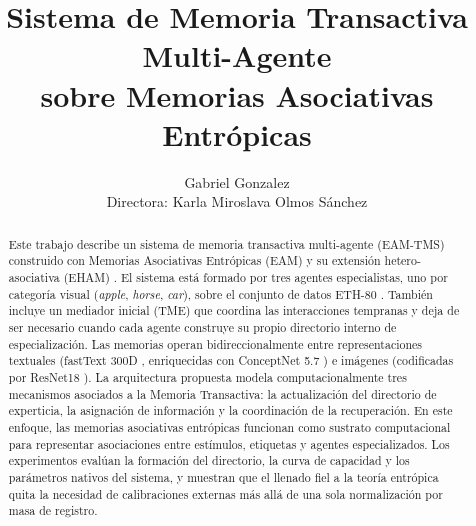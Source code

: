 \documentclass[11pt]{article}
\title{%
    \textbf{Sistema de Memoria Transactiva Multi-Agente}\\
    \textbf{sobre Memorias Asociativas Entrópicas}\\[0.5em]
}
\author{Gabriel Gonzalez\\[0.4em]\small Directora: Karla Miroslava Olmos Sánchez}
\begin{document}
\maketitle

\begin{abstract}
Este trabajo describe un sistema de memoria transactiva multi-agente (EAM-TMS) construido
con Memorias Asociativas Entrópicas (EAM) y su extensión hetero-asociativa
(EHAM) \cite{pineda2021entropic,morales2024hetero}.
El sistema está formado por tres agentes especialistas, uno por categoría visual
(\textit{apple}, \textit{horse}, \textit{car}), sobre el conjunto de datos ETH-80
\cite{leibe2003eth80}. También incluye un mediador inicial (TME) que coordina las
interacciones tempranas y deja de ser necesario cuando cada agente construye su propio
directorio interno de especialización.
Las memorias operan bidireccionalmente entre representaciones textuales (fastText 300D
\cite{bojanowski2017fasttext}, enriquecidas con ConceptNet 5.7 \cite{speer2017conceptnet})
e imágenes (codificadas por ResNet18 \cite{he2016resnet}).
La arquitectura propuesta modela computacionalmente tres mecanismos asociados a la Memoria Transactiva\cite{wegner1987transactive}: 
la actualización del directorio de experticia, 
la asignación de información y la coordinación de la recuperación. 
En este enfoque, las memorias asociativas entrópicas funcionan como sustrato computacional para representar asociaciones entre estímulos, 
etiquetas y agentes especializados.
Los experimentos evalúan la formación del directorio, la curva de capacidad y los
parámetros nativos del sistema, y muestran que el llenado fiel a la teoría entrópica
quita la necesidad de calibraciones externas más allá de una sola normalización por
masa de registro.
\end{abstract}

\tableofcontents
\newpage











\end{document}
